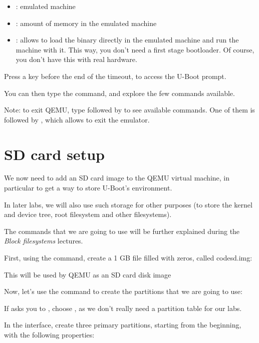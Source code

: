 \begin{itemize}
\item {}: emulated machine
\item {}: amount of memory in the emulated machine
\item {}: allows to load the binary directly in the emulated
      machine and run the machine with it. This way, you don't
      need a first stage bootloader. Of course, you don't
      have this with real hardware.
\end{itemize}

Press a key before the end of the timeout, to access the U-Boot prompt.

You can then type the  command, and explore the few commands
available.

Note: to exit QEMU, type \code{[Ctrl][a]} followed by \code{[h]}
to see available commands. One of them is \code{[Ctrl][a]} followed by
\code{[x]}, which allows to exit the emulator.

\section{SD card setup}

We now need to add an SD card image to the QEMU virtual machine,
in particular to get a way to store U-Boot's environment.

In later labs, we will also use such storage for other purposes
(to store the kernel and device tree, root filesystem and other
filesystems).

The commands that we are going to use will be further explained
during the {\em Block filesystems} lectures.

First, using the  command, create a 1 GB file
filled with zeros, called code{sd.img}:


This will be used by QEMU as an SD card disk image

Now, let's use the  command to create the partitions that
we are going to use:


If  asks you to , choose
, as we don't really need a  partition table for
our labs.

In the  interface, create three primary partitions,
starting from the beginning, with the following properties:

